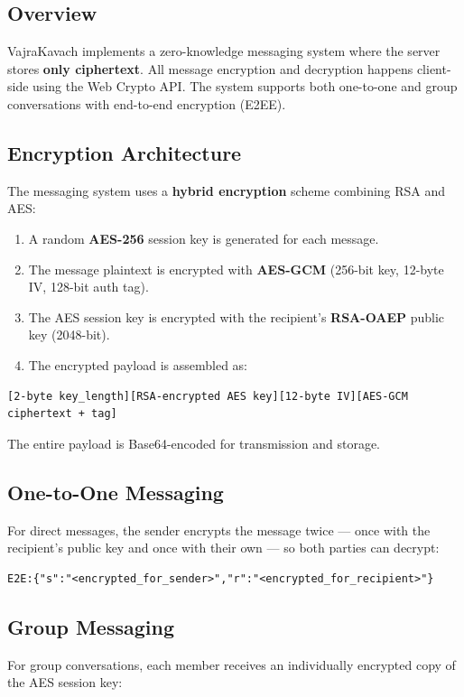 \documentclass[12pt,a4paper]{article}
\begin{document}
\subsection{Overview}
VajraKavach implements a zero-knowledge messaging system where the server stores \textbf{only ciphertext}. All message encryption and decryption happens client-side using the Web Crypto API. The system supports both one-to-one and group conversations with end-to-end encryption (E2EE).

\subsection{Encryption Architecture}
The messaging system uses a \textbf{hybrid encryption} scheme combining RSA and AES:

\begin{enumerate}
  \item A random \textbf{AES-256} session key is generated for each message.
  \item The message plaintext is encrypted with \textbf{AES-GCM} (256-bit key, 12-byte IV, 128-bit auth tag).
  \item The AES session key is encrypted with the recipient's \textbf{RSA-OAEP} public key (2048-bit).
  \item The encrypted payload is assembled as:
\end{enumerate}

\begin{lstlisting}
[2-byte key_length][RSA-encrypted AES key][12-byte IV][AES-GCM ciphertext + tag]
\end{lstlisting}

The entire payload is Base64-encoded for transmission and storage.

\subsection{One-to-One Messaging}
For direct messages, the sender encrypts the message twice --- once with the recipient's public key and once with their own --- so both parties can decrypt:

\begin{lstlisting}
E2E:{"s":"<encrypted_for_sender>","r":"<encrypted_for_recipient>"}
\end{lstlisting}

\subsection{Group Messaging}
For group conversations, each member receives an individually encrypted copy of the AES session key:
\end{document}
